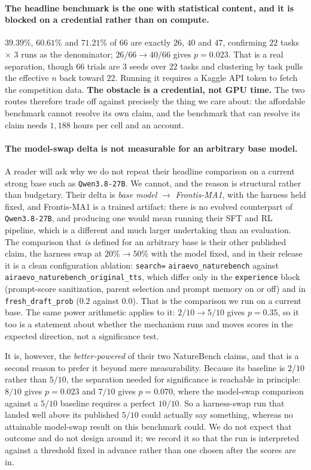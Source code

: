 \paragraph{The headline benchmark is the one with statistical content, and it is blocked on a
credential rather than on compute.}
$39.39\%$, $60.61\%$ and $71.21\%$ of $66$ are exactly $26$, $40$ and $47$, confirming $22$
tasks $\times$ $3$ runs as the denominator; $26/66 \to 40/66$ gives $p = 0.023$. That is a
real separation, though $66$ trials are $3$ seeds over $22$ tasks and clustering by task pulls
the effective $n$ back toward $22$. Running it requires a Kaggle API token to fetch the
competition data. \textbf{The obstacle is a credential, not GPU time.} The two routes
therefore trade off against precisely the thing we care about: the affordable benchmark cannot
resolve its own claim, and the benchmark that can resolve its claim needs $1{,}188$ hours per
cell and an account.

\paragraph{The model-swap delta is not measurable for an arbitrary base model.}
A reader will ask why we do not repeat their headline comparison on a current strong base such
as \texttt{Qwen3.8-27B}. We cannot, and the reason is structural rather than budgetary. Their
delta is \emph{base model} $\to$ \emph{Frontis-MA1}, with the harness held fixed, and
Frontis-MA1 is a trained artifact: there is no evolved counterpart of \texttt{Qwen3.8-27B},
and producing one would mean running their SFT and RL pipeline, which is a different and much
larger undertaking than an evaluation. The comparison that \emph{is} defined for an arbitrary
base is their other published claim, the harness swap at $20\% \to 50\%$ with the model
fixed, and in their release it is a clean configuration ablation: \texttt{search=}
\texttt{airaevo\_naturebench} against \texttt{airaevo\_naturebench\_original\_tts}, which
differ only in the \texttt{experience} block (prompt-score sanitization, parent selection and
prompt memory on or off) and in \texttt{fresh\_draft\_prob} ($0.2$ against $0.0$). That is the
comparison we run on a current base. The same power arithmetic applies to it: $2/10 \to 5/10$
gives $p = 0.35$, so it too is a statement about whether the mechanism runs and moves scores
in the expected direction, not a significance test.

It is, however, the \emph{better-powered} of their two NatureBench claims, and that is a
second reason to prefer it beyond mere measurability. Because its baseline is $2/10$ rather
than $5/10$, the separation needed for significance is reachable in principle: $8/10$ gives
$p=0.023$ and $7/10$ gives $p=0.070$, where the model-swap comparison against a $5/10$
baseline requires a perfect $10/10$. So a harness-swap run that landed well above its
published $5/10$ could actually say something, whereas no attainable model-swap result on
this benchmark could. We do not expect that outcome and do not design around it; we record
it so that the run is interpreted against a threshold fixed in advance rather than one
chosen after the scores are in.

